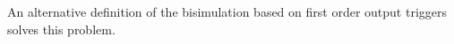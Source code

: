 \begin{comment}
\begin{definition}[Higher-Order Bisimulation]\rm
	\label{def:HO_bisim}
	Typed relation
	$\Re$ is a {\em HO-bisimulation} if whenever
	$\horel{\Gamma}{\Delta_1}{P_1}{\ \Re\ }{\Delta_2}{Q_1}$ implies:
%
	\begin{enumerate}
		\item	$\forall \news{\tilde{m_1}} \bactout{n}{V_1}$ such that
			\[
				\horel{\Gamma}{\Delta_1}{P_1}{\hby{\news{\tilde{m_1}} \bactout{n}{V_1}}}{\Delta_1'}{P_2}
			\]
			implies that $\exists Q_2, V_2$ such that
			\[
				\horel{\Gamma}{\Delta_2}{Q_1}{\Hby{\news{\tilde{m_2}} \bactout{n}{V_2}}}{\Delta_2'}{Q_2}
			\]
			and for fresh $t$:
			\[
				\mhorel{\Gamma}{\Delta_1''}{\newsp{\tilde{m_1}}{P_2 \Par \hotrigger{t}{x}{s}{V_1}}}
				{\ \Re\ }
				{\Delta_2''}{}{\newsp{\tilde{m_2}}{Q_2 \Par \hotrigger{t}{x}{s}{V_2}}}
			\]
%
		\item	$\forall \ell \not= \news{\tilde{m}} \bactout{n}{V}$ such that
			\[
				\horel{\Gamma}{\Delta_1}{P_1}{\hby{\ell}}{\Delta_1'}{P_2}
			\]
			implies that $\exists Q_2$ such that 
			\[
				\horel{\Gamma}{\Delta_1}{Q_1}{\Hby{\ell}}{\Delta_2'}{Q_2}
			\]
			and
			$\horel{\Gamma}{\Delta_1'}{P_2}{\ \Re\ }{\Delta_2'}{Q_2}$

		\item	The symmetric cases of 1 and 2.
	\end{enumerate}
	The Knaster Tarski theorem ensures that the largest bisimulation exists,
	it is called HO-bisimilarity and is denoted by $\wb$.
\end{definition}
\end{comment}
An alternative definition of the bisimulation based on first order
output triggers solves this problem.

